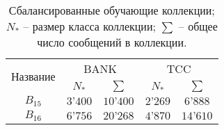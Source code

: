 \begin{table}[htp!]
\centering
\caption{Сбалансированные обучающие коллекции;
    $N_*$ -- размер класса коллекции;
    $\sum$ -- общее число сообщений в коллекции.
}
\label{table:balancedTrainCollections}
\begin{tabular}{ccccc}
    \hline
    \multicolumn{1}{c|}{\multirow{2}{*}{Название}} & \multicolumn{2}{c|}{BANK}                                & \multicolumn{2}{c}{TCC}               \\ \cline{2-5}
    \multicolumn{1}{c|}{}                          & \multicolumn{1}{c|}{$N_*$} & \multicolumn{1}{c|}{$\sum$} & \multicolumn{1}{c|}{$N_*$} & $\sum$   \\ \hline
    $B_{15}$                                       & $3’400$                    & $10’400$                    & $2’269$                    & $6’888$  \\
    $B_{16}$                                       & $6’756$                    & $20’268$                    & $4’870$                    & $14’610$ \\ \hline
\end{tabular}
\end{table}
